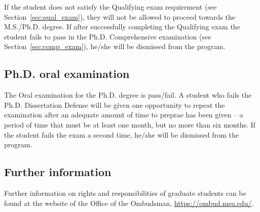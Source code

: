 If the student does not satisfy the Qualifying exam requirement (see
Section~\ref{sec:qual_exam}), they will not be allowed to proceed
towards the M.S./Ph.D. degree.  If after successfully completing the
Qualifying exam the student fails to pass in the Ph.D. Comprehensive
examination (see Section~\ref{sec:comp_exam}), he/she will be
dismissed from the program.  

\subsection{Ph.D. oral examination}

The Oral examination for the Ph.D. degree is pass/fail.  A student who fails the Ph.D. Dissertation Defense will be given one
opportunity to repeat the examination after an
adequate amount of time to preprae has been given -- a period of time
that must be at least one month, but no more than six months.  If the student fails the exam a second
time, he/she will be dismissed from the program.

\subsection{Further information}

Further information on rights and responsibilities of graduate
students can be found at the website of the Office of the Ombudsman,
\url{https://ombud.msu.edu/}.

 
